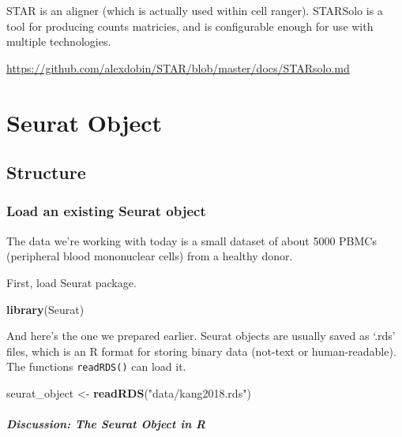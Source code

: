 \documentclass[
]{book}
\newenvironment{Shaded}{\begin{snugshade}}{\end{snugshade}}
\newcommand{\FunctionTok}[1]{\textcolor[rgb]{0.13,0.29,0.53}{\textbf{#1}}}
\newcommand{\NormalTok}[1]{#1}
\newcommand{\OtherTok}[1]{\textcolor[rgb]{0.56,0.35,0.01}{#1}}
\newcommand{\StringTok}[1]{\textcolor[rgb]{0.31,0.60,0.02}{#1}}
\begin{document}
STAR is an aligner (which is actually used within cell ranger). STARSolo is a tool for producing counts matricies, and is configurable enough for use with multiple technologies.

\url{https://github.com/alexdobin/STAR/blob/master/docs/STARsolo.md}

\hypertarget{part-seurat-object}{%
\part{Seurat Object}\label{part-seurat-object}}

\hypertarget{structure}{%
\chapter{Structure}\label{structure}}

\hypertarget{load-an-existing-seurat-object}{%
\section{Load an existing Seurat object}\label{load-an-existing-seurat-object}}

The data we're working with today is a small dataset of about 5000 PBMCs (peripheral blood mononuclear cells) from a healthy donor.

First, load Seurat package.

\begin{Shaded}
\begin{Highlighting}[]
\FunctionTok{library}\NormalTok{(Seurat)}
\end{Highlighting}
\end{Shaded}

And here's the one we prepared earlier. Seurat objects are usually saved as `.rds' files, which is an R format for storing binary data (not-text or human-readable). The functions \texttt{readRDS()} can load it.

\begin{Shaded}
\begin{Highlighting}[]
\NormalTok{seurat\_object }\OtherTok{\textless{}{-}} \FunctionTok{readRDS}\NormalTok{(}\StringTok{"data/kang2018.rds"}\NormalTok{)}
\end{Highlighting}
\end{Shaded}

\hypertarget{discussion-the-seurat-object-in-r}{%
\subsubsection*{Discussion: The Seurat Object in R}\label{discussion-the-seurat-object-in-r}}
\end{document}
